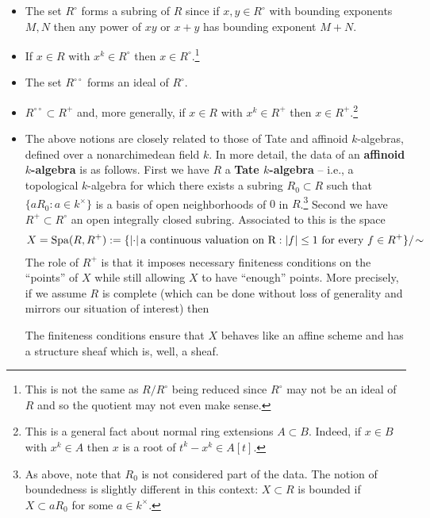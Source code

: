\documentclass[11pt]{article}
\begin{document}
\begin{remark}
\hfill
\begin{itemize}
\item The set $R^{\circ}$ forms a subring of $R$ since if $x,y\in R^{\circ}$ with bounding exponents $M,N$ then any power of $xy$ or $x+y$ has bounding exponent $M+N$.

\item If $x\in R$ with $x^k\in R^{\circ}$ then $x\in R^{\circ}$.\footnote{This is not the same as $R/R^{\circ}$ being reduced since $R^{\circ}$ may not be an ideal of $R$ and so the quotient may not even make sense.}

\item The set $R^{\circ\circ}$ forms an ideal of $R^{\circ}$.

\item $R^{\circ\circ}\subset R^+$ and, more generally, if $x\in R$ with $x^k\in R^+$ then $x\in R^+$.\footnote{This is a general fact about normal ring extensions $A\subset B$. Indeed, if $x\in B$ with $x^k\in A$ then $x$ is a root of $t^k-x^k\in A[t]$.}

\item The above notions are closely related to those of Tate and affinoid $k$-algebras, defined over a nonarchimedean field $k$. In more detail, the data of an \textbf{affinoid $k$-algebra} is as follows. First we have $R$ a \textbf{Tate $k$-algebra} -- i.e., a topological $k$-algebra for which there exists a subring $R_0\subset R$ such that $\{aR_0 : a\in k^{\times}\}$ is a basis of open neighborhoods of $0$ in $R$.\footnote{As above, note that $R_0$ is not considered part of the data. The notion of boundedness is slightly different in this context: $X\subset R$ is bounded if $X\subset aR_0$ for some $a\in k^{\times}$.} Second we have $R^+\subset R^{\circ}$ an open integrally closed subring. Associated to this is the space
\begin{align*}
X=\operatorname{Spa}(R,R^+)
:=\{\left\lvert\cdot\right\rvert\textrm{a continuous valuation on R} : |f|\leq1\textrm{ for every }f\in R^+\}/\!\sim
\end{align*}
The role of $R^+$ is that it imposes necessary finiteness conditions on the ``points'' of $X$ while still allowing $X$ to have ``enough'' points. More precisely, if we assume $R$ is complete (which can be done without loss of generality and mirrors our situation of interest) then 
The finiteness conditions ensure that $X$ behaves like an affine scheme and has a structure sheaf which is, well, a sheaf.
\end{itemize}
\end{remark}
\end{document}
